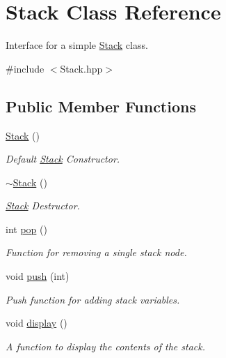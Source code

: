 \hypertarget{classStack}{\section{\-Stack \-Class \-Reference}
\label{classStack}
}


\-Interface for a simple \hyperlink{classStack}{\-Stack} class.  




{\ttfamily \#include $<$\-Stack.\-hpp$>$}

\subsection*{\-Public \-Member \-Functions}
\begin{DoxyCompactItemize}
\item 
\hyperlink{classStack_a14cd1cba325bead4ff0a91bc6eb0f6f5}{\-Stack} ()
\begin{DoxyCompactList}\small\item\em \-Default \hyperlink{classStack}{\-Stack} \-Constructor. \end{DoxyCompactList}\item 
\hyperlink{classStack_a40bd5dff912f0e5290777c4b46d17809}{$\sim$\-Stack} ()
\begin{DoxyCompactList}\small\item\em \hyperlink{classStack}{\-Stack} \-Destructor. \end{DoxyCompactList}\item 
int \hyperlink{classStack_ad2d05ce55e7abd4a8d8ea1263be99675}{pop} ()
\begin{DoxyCompactList}\small\item\em \-Function for removing a single stack node. \end{DoxyCompactList}\item 
void \hyperlink{classStack_acaf50a3a40fc274ee1392cce00b02979}{push} (int)
\begin{DoxyCompactList}\small\item\em \-Push function for adding stack variables. \end{DoxyCompactList}\item 
void \hyperlink{classStack_ad2d64a259a5e8abc098373148f30d9d4}{display} ()
\begin{DoxyCompactList}\small\item\em \-A function to display the contents of the stack. \end{DoxyCompactList}\end{DoxyCompactItemize}
